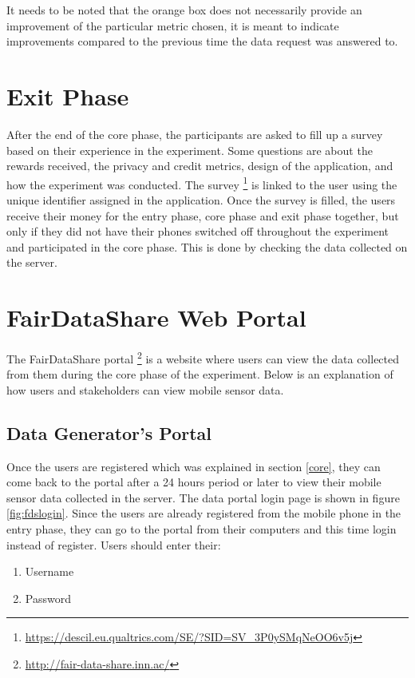It needs to be noted that the orange box does not necessarily provide an improvement of the particular metric chosen, it is meant to indicate improvements compared to the previous time the data request was answered to.


\section{Exit Phase}

After the end of the core phase, the participants are asked to fill up a survey based on their experience in the experiment. Some questions are
about the rewards received, the privacy and credit metrics, design of the application, and how the experiment was conducted. The survey \footnote{\url{https://descil.eu.qualtrics.com/SE/?SID=SV_3P0ySMqNeOO6v5j}} is linked to the user using the unique identifier assigned in the application. Once the survey is filled, the users receive their money for the entry phase, core phase and exit phase together, but only if they did not have their phones switched off throughout the experiment and participated in the core phase. This is done by checking the data collected on the server.

\section{FairDataShare Web Portal} \label{fds}

The FairDataShare portal \footnote{\url{http://fair-data-share.inn.ac/}} is a website where users can view the data collected from them during the core phase of the experiment. Below is an explanation of how users and stakeholders can view mobile sensor data.

\subsection{Data Generator's Portal}

Once the users are registered which was explained in section \ref{core}, they can come back to the portal after a 24 hours period or later to view their mobile sensor data collected in the server. The data portal login page is shown in figure \ref{fig:fdslogin}. Since the users are already registered from the mobile phone in the entry phase, they can go to the portal from their computers and this time login instead of register. Users should enter their: 

\begin{enumerate}
    \item Username
    \item Password
\end{enumerate}

